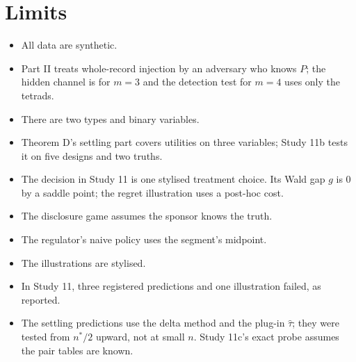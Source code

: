 \documentclass[11pt]{article}
\theoremstyle{definition}\newtheorem{definition}{Definition}\newtheorem{remark}{Remark}
\begin{document}
\section{Limits}
\begin{itemize}
\item All data are synthetic.
\item Part II treats whole-record injection by an adversary who knows $P$; the hidden channel is for $m=3$ and the detection test for
  $m=4$ uses only the tetrads.
\item There are two types and binary variables.
\item Theorem D's settling part covers utilities on three variables; Study 11b tests it on five designs and two truths.
\item The decision in Study 11 is one stylised treatment choice. Its Wald gap $g$ is $0$ by a saddle point; the regret illustration uses a
  post-hoc cost.
\item The disclosure game assumes the sponsor knows the truth.
\item The regulator's naive policy uses the segment's midpoint.
\item The illustrations are stylised.
\item In Study 11, three registered predictions and one illustration failed, as reported.
\item The settling predictions use the delta method and the plug-in $\hat\tau$; they were tested from $n^*/2$ upward, not at small $n$.
  Study 11c's exact probe assumes the pair tables are known.
\end{itemize}

\appendix
\end{document}
